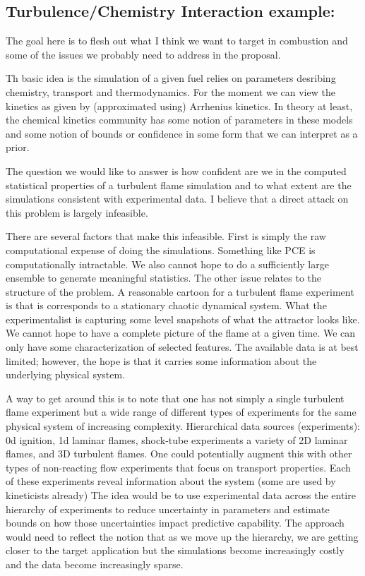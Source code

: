 \documentclass[11pt]{article}
\begin{document}

\subsection*{Turbulence/Chemistry Interaction example:}

The goal here is to flesh out what I think we want to target in combustion
and some of the issues we probably need to address in the proposal.

Th basic idea is the simulation of a given fuel relies on parameters
desribing chemistry, transport and thermodynamics.
For the moment we can view the kinetics as given by (approximated using)
Arrhenius kinetics.
In theory at least, the chemical kinetics community has some notion of parameters
in these models and some notion of bounds or confidence in some form that we can
interpret as a prior.

The question we would like to answer is how confident are we in the computed statistical
properties of a turbulent flame simulation and to what extent are the simulations consistent
with experimental data.  I believe that a direct attack on this problem is largely infeasible.

There are several factors that make this infeasible.  First is simply the raw computational
expense of doing the simulations.  Something like PCE is computationally intractable.  We
also cannot hope to do a sufficiently large ensemble to generate meaningful statistics.
The other issue relates to the structure of the problem.  A reasonable cartoon for a 
turbulent flame experiment is that is corresponds to a stationary chaotic dynamical system.
What the experimentalist is capturing some level snapshots of what the attractor looks like.
We cannot hope to have a complete picture of the flame at a given time.  We can only
have some characterization of selected features.  The available data is at best limited;
however, the hope is that it carries some information about the underlying physical system.

A way to get around this is to note that one has not simply a single turbulent flame
experiment but a wide range of different types of experiments for the same physical
system of increasing complexity.  
Hierarchical data sources (experiments): 0d ignition, 1d laminar flames, shock-tube experiments
a variety of 2D laminar flames, and 3D turbulent flames.
One could potentially augment this with other types of non-reacting flow experiments that focus
on transport properties. 
Each of these experiments reveal information about the system (some are used by kineticists already)
The idea would be to use experimental data across the entire hierarchy of experiments to reduce
uncertainty in parameters and estimate bounds on how those uncertainties impact predictive capability.
The approach would need to reflect the notion that as we move up the hierarchy, we are
getting closer to the target application but the simulations become
increasingly costly and the data become increasingly sparse.
\end{document}
